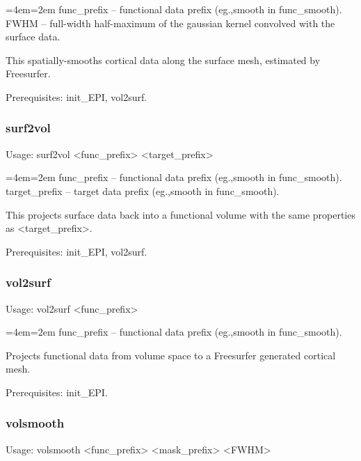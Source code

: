 \documentclass[final,titlepage,letterpaper,oneside,12pt]{article}
\renewcommand{\texttt}[2][BrickRed]{\textcolor{#1}{\ttfamily #2}}%
\newenvironment{blockquote}{%
  \par%
  \medskip
  \leftskip=4em\rightskip=2em%
  \noindent\ignorespaces}{%
  \par\medskip}
\begin{document}
\begin{blockquote}
func\_prefix -- functional data prefix (eg.,smooth in func\_smooth). \\
FWHM -- full-width half-maximum of the gaussian kernel convolved with the surface data. \
\end{blockquote}

\noindent This spatially-smooths cortical data along the surface mesh, estimated by Freesurfer.

Prerequisites: \texttt{init\_EPI}, \texttt{vol2surf}.

\subsubsection{surf2vol}
Usage: \texttt{surf2vol <func\_prefix> <target\_prefix>}

\begin{blockquote}
func\_prefix -- functional data prefix (eg.,smooth in func\_smooth). \\
target\_prefix -- target data prefix (eg.,smooth in func\_smooth). \
\end{blockquote}

\noindent This projects surface data back into a functional volume with the same properties as <target\_prefix>.

Prerequisites: \texttt{init\_EPI}, \texttt{vol2surf}.

\subsubsection{vol2surf}
Usage: \texttt{vol2surf <func\_prefix>}

\begin{blockquote}
func\_prefix -- functional data prefix (eg.,smooth in func\_smooth).
\end{blockquote}

\noindent Projects functional data from volume space to a Freesurfer generated cortical mesh.

Prerequisites: \texttt{init\_EPI}.

\subsubsection{volsmooth}
Usage: \texttt{volsmooth <func\_prefix> <mask\_prefix> <FWHM>}
\end{document}
